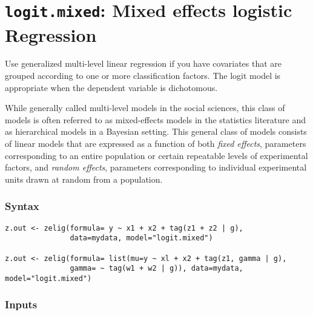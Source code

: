 \section{{\tt logit.mixed}: Mixed effects logistic Regression}
\label{mixed}

Use generalized multi-level linear regression if you have covariates that are grouped according to one or more classification factors. The logit model is appropriate when the dependent variable is dichotomous.

While generally called multi-level models in the social sciences, this class of models is often referred to as mixed-effects models in the statistics literature and as hierarchical models in a Bayesian setting. This general class of models consists of linear models that are expressed as a function of both \emph{fixed effects}, parameters corresponding to an entire population or certain repeatable levels of experimental factors, and \emph{random effects}, parameters corresponding to individual experimental units drawn at random from a population.

\subsubsection{Syntax}

\begin{verbatim}
z.out <- zelig(formula= y ~ x1 + x2 + tag(z1 + z2 | g),
               data=mydata, model="logit.mixed")

z.out <- zelig(formula= list(mu=y ~ xl + x2 + tag(z1, gamma | g),
               gamma= ~ tag(w1 + w2 | g)), data=mydata, model="logit.mixed")
\end{verbatim}

\subsubsection{Inputs}

